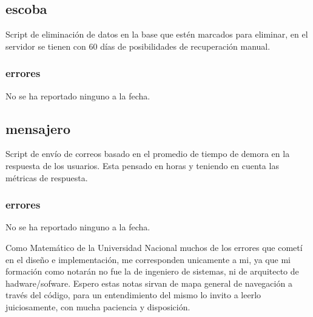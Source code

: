 \documentclass[10pt,a4paper]{book}
\begin{document}
	\subsection{escoba}
	Script de eliminación de datos en la base que estén marcados para eliminar, en el servidor se tienen con 60 días de posibilidades de recuperación manual.
	\subsubsection{errores}
	No se ha reportado ninguno a la fecha.

	\subsection{mensajero}
	Script de envío de correos basado en el promedio de tiempo de demora en la respuesta de los usuarios. Esta pensado en horas y teniendo en cuenta las métricas de respuesta.
	\subsubsection{errores}
	No se ha reportado ninguno a la fecha.
	
	Como Matemático de la Universidad Nacional muchos de los errores que cometí en el diseño e implementación, me corresponden unicamente a mi, ya que mi formación como notarán no fue la de ingeniero de sistemas, ni de arquitecto de hadware/sofware. Espero estas notas sirvan de mapa general de navegación a través del código, para un entendimiento del mismo lo invito a leerlo juiciosamente, con mucha paciencia y disposición.
	
\end{document}
